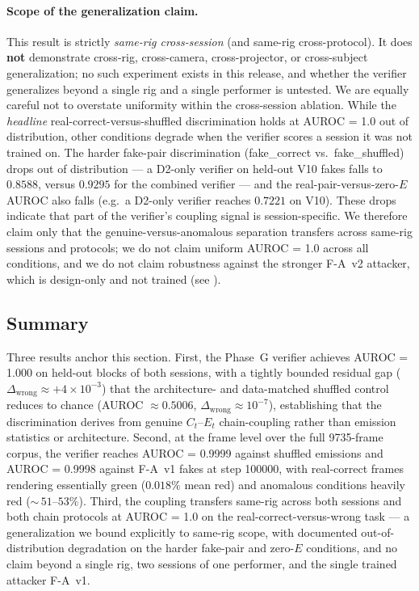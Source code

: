 \paragraph{Scope of the generalization claim.}
This result is strictly \emph{same-rig cross-session} (and same-rig
cross-protocol). It does \textbf{not} demonstrate cross-rig, cross-camera,
cross-projector, or cross-subject generalization; no such experiment exists in
this release, and whether the verifier generalizes beyond a single rig and a
single performer is untested. We are equally careful not to overstate uniformity within
the cross-session ablation. While the \emph{headline} real-correct-versus-shuffled
discrimination holds at AUROC = 1.0 out of distribution, other conditions degrade
when the verifier scores a session it was not trained on. The harder fake-pair
discrimination (fake\_correct vs.\ fake\_shuffled) drops out of distribution --- a
D2-only verifier on held-out V10 fakes falls to $0.8588$, versus $0.9295$ for the
combined verifier --- and the real-pair-versus-zero-$E$ AUROC also falls (e.g.\ a
D2-only verifier reaches $0.7221$ on V10). These drops indicate that part of the
verifier's coupling signal is session-specific. We therefore claim only that the
genuine-versus-anomalous separation transfers across same-rig sessions and
protocols; we do not claim uniform AUROC = 1.0 across all conditions, and we do
not claim robustness against the stronger F-A~v2 attacker, which is design-only
and not trained (see ).

\subsection{Summary}
\label{sec:results_main_summary}

Three results anchor this section. First, the Phase~G verifier achieves
AUROC = 1.000 on held-out blocks of both sessions, with a tightly bounded
residual gap ($\Delta_{\text{wrong}} \approx +4\times10^{-3}$) that the
architecture- and data-matched shuffled control reduces to chance
(AUROC $\approx 0.5006$, $\Delta_{\text{wrong}} \approx 10^{-7}$), establishing
that the discrimination derives from genuine $C_t$--$E_t$ chain-coupling rather
than emission statistics or architecture. Second, at the frame level over the
full \num{9735}-frame corpus, the verifier reaches AUROC = 0.9999 against
shuffled emissions and AUROC = 0.9998 against F-A~v1 fakes at step \num{100000},
with real-correct frames rendering essentially green ($0.018\%$ mean red) and
anomalous conditions heavily red ($\sim$\,$51$--$53\%$). Third, the coupling
transfers same-rig across both sessions and both chain protocols at AUROC = 1.0
on the real-correct-versus-wrong task --- a generalization we bound explicitly to
same-rig scope, with documented out-of-distribution degradation on the harder
fake-pair and zero-$E$ conditions, and no claim beyond a single rig, two
sessions of one performer, and the single trained attacker F-A~v1.
